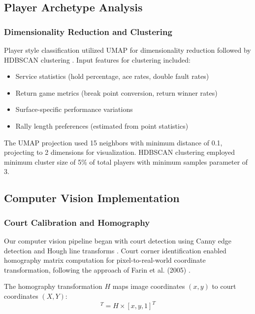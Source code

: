\documentclass[11pt,a4paper]{article}
\begin{document}
\subsection{Player Archetype Analysis}

\subsubsection{Dimensionality Reduction and Clustering}

Player style classification utilized UMAP \citep{mcinnes2018umap} for dimensionality reduction followed by HDBSCAN clustering \citep{campello2013density}. Input features for clustering included:

\begin{itemize}
    \item Service statistics (hold percentage, ace rates, double fault rates)
    \item Return game metrics (break point conversion, return winner rates)
    \item Surface-specific performance variations
    \item Rally length preferences (estimated from point statistics)
\end{itemize}

The UMAP projection used 15 neighbors with minimum distance of 0.1, projecting to 2 dimensions for visualization. HDBSCAN clustering employed minimum cluster size of 5\% of total players with minimum samples parameter of 3.

\subsection{Computer Vision Implementation}

\subsubsection{Court Calibration and Homography}

Our computer vision pipeline began with court detection using Canny edge detection and Hough line transforms \citep{canny1986computational}. Court corner identification enabled homography matrix computation for pixel-to-real-world coordinate transformation, following the approach of Farin et al. (2005) \citep{farin2005robust}.

The homography transformation $H$ maps image coordinates $(x,y)$ to court coordinates $(X,Y)$:
\begin{equation}
[X, Y, 1]^T = H \times [x, y, 1]^T
\end{equation}
\end{document}
